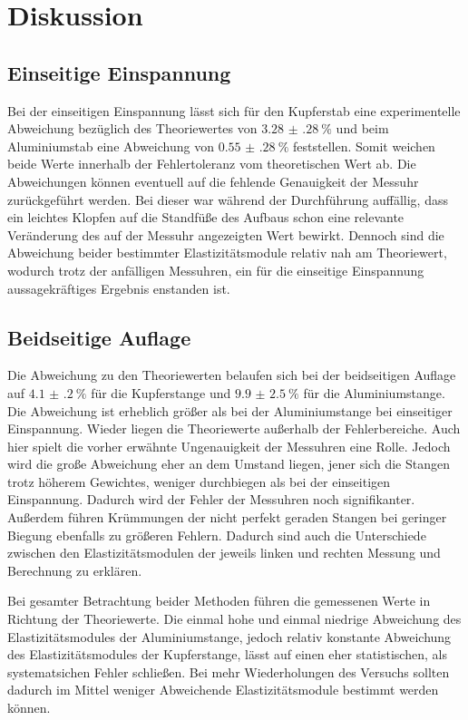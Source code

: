 \section{Diskussion}
\label{sec:Diskussion}

\subsection{Einseitige Einspannung}

Bei der einseitigen Einspannung lässt sich für den Kupferstab eine experimentelle Abweichung bezüglich des Theoriewertes von $\SI{3.28(28)}{\percent}$ und beim Aluminiumstab eine Abweichung von $\SI{0.55(28)}{\percent}$ feststellen. Somit weichen beide Werte innerhalb der Fehlertoleranz vom theoretischen Wert ab. Die Abweichungen können eventuell auf die fehlende Genauigkeit der Messuhr zurückgeführt werden. Bei dieser
war während der Durchführung auffällig, dass ein leichtes Klopfen auf die Standfüße des Aufbaus schon eine relevante
Veränderung des auf der Messuhr angezeigten Wert bewirkt. 
Dennoch sind die Abweichung beider bestimmter Elastizitätsmodule relativ nah am Theoriewert, wodurch trotz der anfälligen Messuhren, ein für die einseitige Einspannung aussagekräftiges Ergebnis enstanden ist.







\subsection{Beidseitige Auflage}

Die Abweichung zu den Theoriewerten belaufen sich bei der beidseitigen Auflage auf $\SI{4.1(2)}{\percent}$ für die Kupferstange und $\SI{9.9(25)}{\percent}$ für die Aluminiumstange. Die Abweichung ist erheblich größer als bei der Aluminiumstange bei einseitiger Einspannung. Wieder liegen die Theoriewerte außerhalb der Fehlerbereiche. Auch hier spielt die vorher erwähnte Ungenauigkeit der Messuhren eine Rolle. Jedoch wird die große Abweichung eher an dem Umstand liegen, jener sich die Stangen trotz höherem Gewichtes, weniger durchbiegen als bei der einseitigen Einspannung. Dadurch wird der Fehler der Messuhren noch signifikanter. Außerdem führen Krümmungen der nicht perfekt geraden Stangen bei geringer Biegung ebenfalls zu größeren Fehlern. Dadurch sind auch die Unterschiede zwischen den Elastizitätsmodulen der jeweils linken und rechten Messung und Berechnung zu erklären. 


Bei gesamter Betrachtung beider Methoden führen die gemessenen Werte in Richtung der Theoriewerte. Die einmal hohe und einmal niedrige Abweichung des Elastizitätsmodules der Aluminiumstange, jedoch relativ konstante Abweichung des Elastizitätsmodules der Kupferstange, lässt auf einen eher statistischen, als systematsichen Fehler schließen. Bei mehr Wiederholungen des Versuchs sollten dadurch im Mittel weniger Abweichende Elastizitätsmodule bestimmt werden können.





